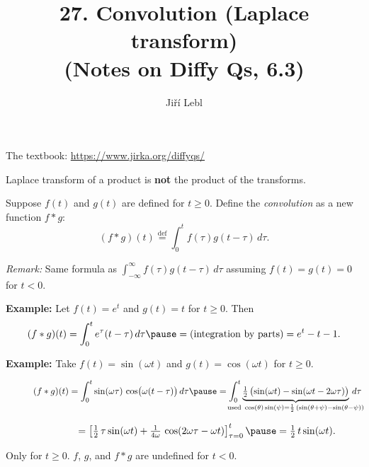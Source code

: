 \documentclass[10pt,aspectratio=169]{beamer}
\author{Ji\v{r}\'i Lebl}
\institute[OSU]{%
Oklahoma State University%
}
\title{27. Convolution (Laplace transform)\\(Notes on Diffy Qs, 6.3)}
\date{}
\begin{document}
\begin{frame}
\titlepage


\begin{center}
The textbook: \url{https://www.jirka.org/diffyqs/}
\end{center}
\end{frame}

\begin{frame}
Laplace transform of a product is \textbf{not} the product of the transforms.

\medskip
\pause

Suppose $f(t)$ and $g(t)$ are defined for $t \geq 0$.  Define
the \emph{convolution} as a new function $f * g$:
\[
(f * g)(t) \overset{\text{def}}{=}
\int_0^t f(\tau) g(t-\tau) \, d\tau .
\]

\pause

\emph{Remark:}  Same formula as
$\int_{-\infty}^\infty f(\tau) g(t-\tau) \, d\tau$
assuming $f(t)=g(t)=0$ for $t < 0$.

\medskip
\pause

\textbf{Example:}
Let $f(t) = e^t$ and $g(t) = t$ for $t \geq 0$.  Then 
\[
(f*g)(t)
=
\int_0^t e^\tau (t-\tau) \, d\tau
\pause
=
\text{(integration by parts)}
=
e^t - t - 1 .
\]

\pause

\textbf{Example:}
Take $f(t) = \sin (\omega t)$ and $g(t) = \cos (\omega t)$ for $t \geq 0$.

\smallskip

$\displaystyle
\quad\qquad
(f*g)(t)
=
\int_0^t  \sin ( \omega \tau ) \,
\cos \bigl( \omega (t-\tau) \bigr) \, d\tau
\pause
=
\int_0^t
\underbrace{
\tfrac{1}{2} \, \bigl( \sin (\omega t) - \sin (\omega t - 2 \omega \tau
) \bigr)
}_{\mathclap{\text{used } \cos (\theta) \sin (\psi) =
\frac{1}{2} \, \left( \sin (\theta + \psi) - \sin (\theta - \psi) \right)}}
\, d\tau
$

\medskip
\pause

$\displaystyle
\quad\qquad
\phantom{(f*g)(t)}
{} =
\left[ \tfrac{1}{2} \, \tau  \sin (\omega t) + \tfrac{1}{4\omega} \, \cos (2 \omega \tau -
\omega t) \right]_{\tau=0}^t
\pause
= \tfrac{1}{2} \, t \sin (\omega t) .
$

\medskip
\pause

Only for $t \geq 0$. \quad  $f$, $g$, and $f*g$ are undefined for $t < 0$.

\end{frame}
\end{document}
